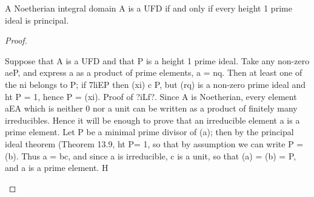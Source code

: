 
\begin{theorem}[Theorem 20.1]\label{mcrt-auto-theorem-20-1}
\begin{mathematicalrecord}
A Noetherian integral domain A is a UFD if and only if
every height 1 prime ideal is principal.
\end{mathematicalrecord}
\end{theorem}
\begin{proof}
\begin{mathematicalrecord}
Suppose that A is a UFD and that P is a height 1
prime ideal. Take any non-zero aeP, and express a as a product of prime
elements, a = nq. Then at least one of the ni belongs to P; if 7liEP then
(xi) c P, but (rq) is a non-zero prime ideal and ht P = 1, hence P = (xi).
Proof of ?iLf?. Since A is Noetherian, every element aEA which is neither
0 nor a unit can be written as a product of finitely many irreducibles.
Hence it will be enough to prove that an irreducible element a is a prime
element. Let P be a minimal prime divisor of (a); then by the principal
ideal theorem (Theorem 13.9, ht P= 1, so that by assumption we can
write P =(b). Thus a = bc, and since a is irreducible, c is a unit, so that
(a) = (b) = P, and a is a prime element.    H
\end{mathematicalrecord}
\end{proof}


